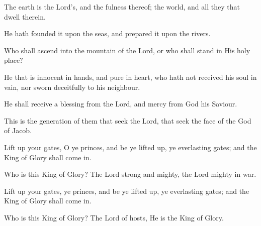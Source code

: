 The earth is the Lord's, and the fulness thereof; the world, and all they that dwell therein.

He hath founded it upon the seas, and prepared it upon the rivers.

Who shall ascend into the mountain of the Lord, or who shall stand in His holy place?

He that is innocent in hands, and pure in heart, who hath not received his soul in vain, nor sworn deceitfully to his neighbour.

He shall receive a blessing from the Lord, and mercy from God his Saviour.

This is the generation of them that seek the Lord, that seek the face of the God of Jacob.

Lift up your gates, O ye princes, and be ye lifted up, ye everlasting gates; and the King of Glory shall come in.

Who is this King of Glory? The Lord strong and mighty, the Lord mighty in war.

Lift up your gates, ye princes, and be ye lifted up, ye everlasting gates; and the King of Glory shall come in.

Who is this King of Glory? The Lord of hosts, He is the King of Glory.
